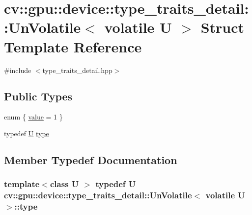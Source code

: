 \hypertarget{structcv_1_1gpu_1_1device_1_1type__traits__detail_1_1UnVolatile_3_01volatile_01U_01_4}{\section{cv\-:\-:gpu\-:\-:device\-:\-:type\-\_\-traits\-\_\-detail\-:\-:Un\-Volatile$<$ volatile U $>$ Struct Template Reference}
\label{structcv_1_1gpu_1_1device_1_1type__traits__detail_1_1UnVolatile_3_01volatile_01U_01_4}
}


{\ttfamily \#include $<$type\-\_\-traits\-\_\-detail.\-hpp$>$}

\subsection*{Public Types}
\begin{DoxyCompactItemize}
\item 
enum \{ \hyperlink{structcv_1_1gpu_1_1device_1_1type__traits__detail_1_1UnVolatile_3_01volatile_01U_01_4_a14fbd44a9bedc3feb3c5cc7d619a0274a3181385a52e25b868dd5a4824904263f}{value} = 1
 \}
\item 
typedef \hyperlink{core__c_8h_aa9c521f41af9a5191e5e4b6ffbae211a}{U} \hyperlink{structcv_1_1gpu_1_1device_1_1type__traits__detail_1_1UnVolatile_3_01volatile_01U_01_4_a40306b60251cae005a899cb1f649c4d3}{type}
\end{DoxyCompactItemize}


\subsection{Member Typedef Documentation}
\hypertarget{structcv_1_1gpu_1_1device_1_1type__traits__detail_1_1UnVolatile_3_01volatile_01U_01_4_a40306b60251cae005a899cb1f649c4d3}{
\subsubsection[{type}]{\setlength{\rightskip}{0pt plus 5cm}template$<$class U $>$ typedef {\bf U} {\bf cv\-::gpu\-::device\-::type\-\_\-traits\-\_\-detail\-::\-Un\-Volatile}$<$ volatile {\bf U} $>$\-::{\bf type}}}\label{structcv_1_1gpu_1_1device_1_1type__traits__detail_1_1UnVolatile_3_01volatile_01U_01_4_a40306b60251cae005a899cb1f649c4d3}


